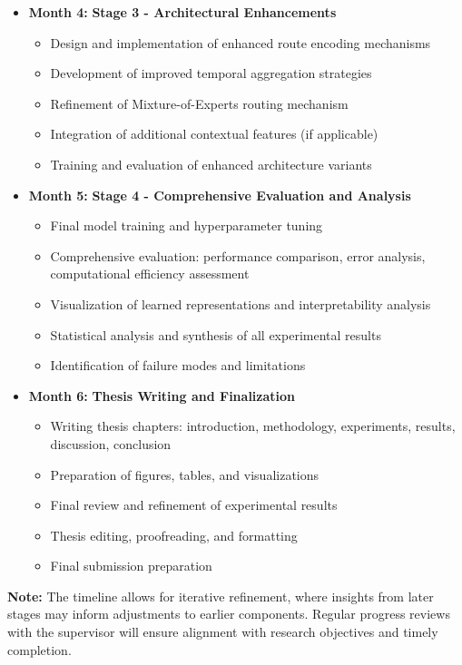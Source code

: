 \begin{itemize}[leftmargin=0pt]
    \item \textbf{Month 4:} \textbf{Stage 3 - Architectural Enhancements}
    \begin{itemize}
        \item Design and implementation of enhanced route encoding mechanisms
        \item Development of improved temporal aggregation strategies
        \item Refinement of Mixture-of-Experts routing mechanism
        \item Integration of additional contextual features (if applicable)
        \item Training and evaluation of enhanced architecture variants
    \end{itemize}
    
    \item \textbf{Month 5:} \textbf{Stage 4 - Comprehensive Evaluation and Analysis}
    \begin{itemize}
        \item Final model training and hyperparameter tuning
        \item Comprehensive evaluation: performance comparison, error analysis, computational efficiency assessment
        \item Visualization of learned representations and interpretability analysis
        \item Statistical analysis and synthesis of all experimental results
        \item Identification of failure modes and limitations
    \end{itemize}
    
    \item \textbf{Month 6:} \textbf{Thesis Writing and Finalization}
    \begin{itemize}
        \item Writing thesis chapters: introduction, methodology, experiments, results, discussion, conclusion
        \item Preparation of figures, tables, and visualizations
        \item Final review and refinement of experimental results
        \item Thesis editing, proofreading, and formatting
        \item Final submission preparation
    \end{itemize}
\end{itemize}

\textbf{Note:} The timeline allows for iterative refinement, where insights from later stages may inform adjustments to earlier components. Regular progress reviews with the supervisor will ensure alignment with research objectives and timely completion.

